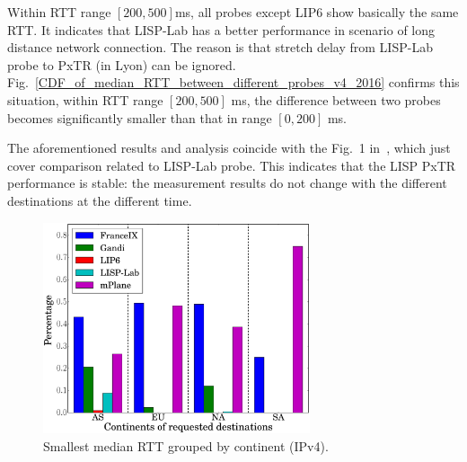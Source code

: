 Within RTT range $[200, 500]$ms, all probes except LIP6 show basically the same RTT. It indicates that LISP-Lab has a better performance in scenario of long distance network connection. The reason is that stretch delay from LISP-Lab probe to PxTR (in Lyon) can be ignored. Fig.~\ref{CDF_of_median_RTT_between_different_probes_v4_2016} confirms this situation, within RTT range $[200, 500]$ ms, the difference between two probes becomes significantly smaller than that in range $[0, 200]$ ms.

The aforementioned results and analysis coincide with the Fig.~1 in~\cite{li2016using}, which just cover comparison related to LISP-Lab probe. This indicates that the LISP PxTR performance is stable: the measurement results do not change with the different destinations at the different time. 

\begin{figure}[!t]
	\centering
	\includegraphics[width=0.7\textwidth]{Pics/v4/Smallest_median_avg(RTT)_proporation.eps}
	\caption{Smallest median RTT grouped by continent (IPv4).
	}
	\label{Smallest_median_avg(RTT)_proporation_v4_2016}
\end{figure}

